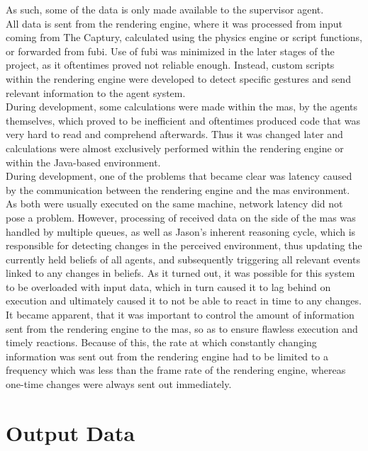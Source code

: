 \documentclass[draft,final]{vutinfth} %
\begin{document}
As such, some of the data is only made available to the supervisor agent. \\
All data is sent from the rendering engine, where it was processed from input coming from The Captury, calculated using the physics engine or script functions, or forwarded from \gls{fubi}. 
Use of \gls{fubi} was minimized in the later stages of the project, as it oftentimes proved not reliable enough. 
Instead, custom scripts within the rendering engine were developed to detect specific gestures and send relevant information to the agent system. \\
During development, some calculations were made within the \gls{mas}, by the agents themselves, which proved to be inefficient and oftentimes produced code that was very hard to read and comprehend afterwards. 
Thus it was changed later and calculations were almost exclusively performed within the rendering engine or within the Java-based environment.  \\
During development, one of the problems that became clear was latency caused by the communication between the rendering engine and the \gls{mas} environment. 
As both were usually executed on the same machine, network latency did not pose a problem. 
However, processing of received data on the side of the \gls{mas} was handled by multiple queues, as well as Jason’s inherent reasoning cycle, which is responsible for detecting changes in the perceived environment, thus updating the currently held beliefs of all agents, and subsequently triggering all relevant events linked to any changes in beliefs. 
As it turned out, it was possible for this system to be overloaded with input data, which in turn caused it to lag behind on execution and ultimately caused it to not be able to react in time to any changes. 
It became apparent, that it was important to control the amount of information sent from the rendering engine to the \gls{mas}, so as to ensure flawless execution and timely reactions. 
Because of this, the rate at which constantly changing information was sent out from the rendering engine had to be limited to a frequency which was less than the frame rate of the rendering engine, whereas one-time changes were always sent out immediately.

\section{Output Data}
\label{chap:outputdata}
\end{document}
